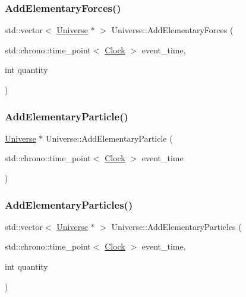 \mbox{\label{classUniverse_a81d294300346e9f901836ab609cce942}} 
\subsubsection{\texorpdfstring{Add\+Elementary\+Forces()}{AddElementaryForces()}}
{\footnotesize\ttfamily std\+::vector$<$ \mbox{\hyperlink{classUniverse}{Universe}} $\ast$ $>$ Universe\+::\+Add\+Elementary\+Forces (\begin{DoxyParamCaption}\item[{std\+::chrono\+::time\+\_\+point$<$ \mbox{\hyperlink{universe_8h_a0ef8d951d1ca5ab3cfaf7ab4c7a6fd80}{Clock}} $>$}]{event\+\_\+time,  }\item[{int}]{quantity }\end{DoxyParamCaption})}

\mbox{\label{classUniverse_ab9c84e0576de50aa4fa46655832ce5e4}} 
\subsubsection{\texorpdfstring{Add\+Elementary\+Particle()}{AddElementaryParticle()}}
{\footnotesize\ttfamily \mbox{\hyperlink{classUniverse}{Universe}} $\ast$ Universe\+::\+Add\+Elementary\+Particle (\begin{DoxyParamCaption}\item[{std\+::chrono\+::time\+\_\+point$<$ \mbox{\hyperlink{universe_8h_a0ef8d951d1ca5ab3cfaf7ab4c7a6fd80}{Clock}} $>$}]{event\+\_\+time }\end{DoxyParamCaption})}

\mbox{\label{classUniverse_a857cf7f208cd11c80736e82fa523feb5}} 
\subsubsection{\texorpdfstring{Add\+Elementary\+Particles()}{AddElementaryParticles()}}
{\footnotesize\ttfamily std\+::vector$<$ \mbox{\hyperlink{classUniverse}{Universe}} $\ast$ $>$ Universe\+::\+Add\+Elementary\+Particles (\begin{DoxyParamCaption}\item[{std\+::chrono\+::time\+\_\+point$<$ \mbox{\hyperlink{universe_8h_a0ef8d951d1ca5ab3cfaf7ab4c7a6fd80}{Clock}} $>$}]{event\+\_\+time,  }\item[{int}]{quantity }\end{DoxyParamCaption})}

